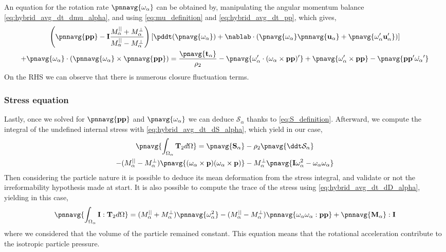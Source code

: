 An equation for the rotation rate $\pnnavg{\omega_\alpha}$ can be obtained by, manipulating the angular momentum balance  \ref{eq:hybrid_avg_dt_dmu_alpha}, and using \ref{eq:mu_definition} and \ref{eq:hybrid_avg_dt_pp}, which gives,
\begin{multline}
    \left(
        \pnnavg{\textbf{pp}} 
        - \textbf{I}\frac{M_\alpha^{||} + M_\alpha^\bot}{M_\alpha^{||} - M_\alpha^\bot}
    \right)\left[
        \pddt (\pnavg{\omega_\alpha})
        + \nablab \cdot (
            \pnavg{\omega_\alpha}\pnnavg{\textbf{u}_\alpha}
            + \pnavg{\omega_\alpha'\textbf{u}_\alpha'})
        \right]\\
    +  \pnavg{\omega_\alpha}
    \cdot(\pnnavg{\omega_\alpha} 
    \times \pnnavg{\textbf{pp}})
    = \frac{\pnavg{\textbf{t}_\alpha}}{\rho_2}
    -\pnavg{\omega_\alpha' \cdot (\omega_\alpha \times \textbf{pp})'}
    +\pnavg{\omega_\alpha' \times \textbf{pp}}
    - \pnavg{\textbf{pp}'\dot{ \omega_\alpha}'}
\end{multline}
On the RHS we can observe that there is numerous closure fluctuation terms.  
\subsubsection*{Stress equation}

Lastly, once we solved for $\pnnavg{\textbf{pp}}$ and $\pnavg{\omega_\alpha}$ we can deduce $\mathcal{S}_\alpha$ thanks to \ref{eq:S_definition}.
Afterward, we compute the integral of the undefined internal stress with \ref{eq:hybrid_avg_dt_dS_alpha}, which yield in our case, 
\begin{multline}
    \pnavg{\int_{\Omega_\alpha} 
        \mathbf{T}_2
    d\Omega}
    =  
      \pnavg{\textbf{S}_\alpha}
    - \rho_2\pnavg{\ddt \mathcal{S}_\alpha}\\
    - (M_\alpha^{||} - M_\alpha^\bot) \pnavg{
        (\omega_\alpha \times \textbf{p}) (\omega_\alpha \times \textbf{p}) } 
    -M_\alpha^\bot \pnavg{\textbf{I} \omega_\alpha^2 -\omega_\alpha\omega_\alpha }
    \label{eq:T2_definition}
\end{multline}
Then considering the particle nature it is possible to deduce its mean deformation from the stress integral, and validate or not the irreformability hypothesis made at start. 
It is also possible to compute the trace of the stress using \ref{eq:hybrid_avg_dt_dD_alpha}, yielding in this case, 
\begin{equation}
    \pnnavg{\int_{\Omega_\alpha} 
        \textbf{I}:\mathbf{T}_2
    d\Omega}
    =  
     (M_\alpha^{||} + M_\alpha^\bot) \pnnavg{
    \omega_\alpha^2} 
    - (M_\alpha^{||} - M_\alpha^\bot) \pnnavg{
    \omega_\alpha\omega_\alpha :  \textbf{pp}}
    + \pnnavg{\textbf{M}_\alpha} : \textbf{I}
\end{equation}
where we considered that the volume of the particle remained constant. 
This equation means that the rotational acceleration contribute to the isotropic particle pressure. 


